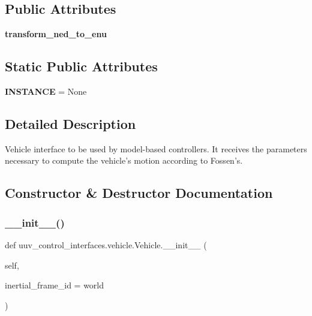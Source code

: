 \subsection*{Public Attributes}
\begin{DoxyCompactItemize}
\item 
\mbox{\label{classuuv__control__interfaces_1_1vehicle_1_1Vehicle_a4864adf82868fd4f7f48fd7de2aaf071}} 
{\bfseries transform\+\_\+ned\+\_\+to\+\_\+enu}
\end{DoxyCompactItemize}
\subsection*{Static Public Attributes}
\begin{DoxyCompactItemize}
\item 
\mbox{\label{classuuv__control__interfaces_1_1vehicle_1_1Vehicle_a10ca3c7b9640ce44fc8e019e3cb37a5d}} 
{\bfseries I\+N\+S\+T\+A\+N\+CE} = None
\end{DoxyCompactItemize}


\subsection{Detailed Description}
\begin{DoxyVerb}Vehicle interface to be used by model-based controllers. It receives the
parameters necessary to compute the vehicle's motion according to Fossen's.
\end{DoxyVerb}
 

\subsection{Constructor \& Destructor Documentation}
\mbox{\label{classuuv__control__interfaces_1_1vehicle_1_1Vehicle_a6d02b3dd4b8f9a6bf0a1b625152da0a5}} 
\subsubsection{\texorpdfstring{\+\_\+\+\_\+init\+\_\+\+\_\+()}{\_\_init\_\_()}}
{\footnotesize\ttfamily def uuv\+\_\+control\+\_\+interfaces.\+vehicle.\+Vehicle.\+\_\+\+\_\+init\+\_\+\+\_\+ (\begin{DoxyParamCaption}\item[{}]{self,  }\item[{}]{inertial\+\_\+frame\+\_\+id = {\ttfamily \textquotesingle{}world\textquotesingle{}} }\end{DoxyParamCaption})}

